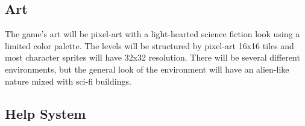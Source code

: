 \documentclass[12pt]{article}
\begin{document}
\subsection{Art}

The game's art will be pixel-art with a light-hearted science fiction look using a limited color palette. The levels will be structured by pixel-art 16x16 tiles and most character sprites will have 32x32 resolution. There will be several different environments, but the general look of the environment will have an alien-like nature mixed with sci-fi buildings. 

\subsection{Help System}
\end{document}

